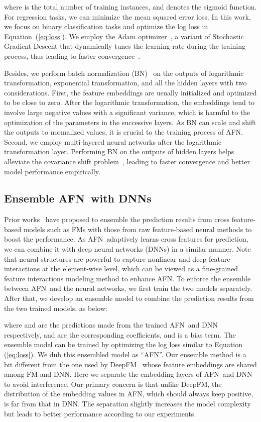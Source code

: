 \documentclass[letterpaper]{article} \usepackage{aaai20}  \usepackage{times}  \usepackage{helvet} \usepackage{courier}  \usepackage[hyphens]{url}  \usepackage{graphicx} \urlstyle{rm} \def\UrlFont{\rm}  \usepackage{graphicx}  \frenchspacing  \setlength{\pdfpagewidth}{8.5in}  \setlength{\pdfpageheight}{11in}
\newcommand{\model}{{AFN}~}
\newcommand{\modelns}{{AFN}}
\begin{document}
\normalsize
where  is the total number of training instances, and  denotes the sigmoid function. For regression tasks, we can minimize the mean squared error loss. In this work, we focus on binary classification tasks and optimize the log loss in Equation~(\ref{eq:loss}). 
We employ the Adam optimizer~\cite{Adam}, a variant of Stochastic Gradient Descent that dynamically tunes the learning rate during the training process, thus leading to faster convergence~\cite{DBLP:conf/dasfaa/SunSJ0LXW19}.

Besides, we perform batch normalization (BN)~\cite{bn} on the outputs of logarithmic transformation, exponential transformation, and all the hidden layers with two considerations. First, the feature embeddings  are usually initialized and optimized to be close to zero. After the logarithmic transformation, the embeddings tend to involve large negative values with a significant variance, which is harmful to the optimization of the parameters in the successive layers. As BN can scale and shift the outputs to normalized values, it is crucial to the training process of \modelns. Second, we employ multi-layered neural networks after the logarithmic transformation layer. Performing BN on the outputs of hidden layers helps alleviate the covariance shift problem~\cite{bn}, leading to faster convergence and better model performance empirically.

\subsection{Ensemble \model with DNNs}
Prior works~\cite{wide_and_deep,DeepFM,xDeepFM} have proposed to ensemble the prediction results from cross feature-based models such as FMs with those from raw feature-based neural methods to boost the performance. 
As \model adaptively learns cross features for prediction, we can combine it with deep neural networks (DNNs) in a similar manner. Note that neural structures are powerful to capture nonlinear and deep feature interactions at the element-wise level, which can be viewed as a fine-grained feature interactions modeling method to enhance \modelns.
To enforce the ensemble between \model and the neural networks, we first train the two models separately. After that, we develop an ensemble model to combine the prediction results from the two trained models, as below:

where  and  are the predictions made from the trained \model and DNN respectively,  and  are the corresponding coefficients, and  is a bias term. The ensemble model can be trained by optimizing the log loss similar to Equation (\ref{eq:loss}).
We dub this ensembled model as ``\modelns''. Our ensemble method is a bit different from the one used by DeepFM~\cite{DeepFM} whose feature embeddings are shared among FM and DNN. Here we separate the embedding layers of \model and DNN to avoid interference. Our primary concern is that unlike DeepFM, the distribution of the embedding values in \modelns, which should always keep positive, is far from that in DNN. The separation slightly increases the model complexity but leads to better performance according to our experiments.
\end{document}
